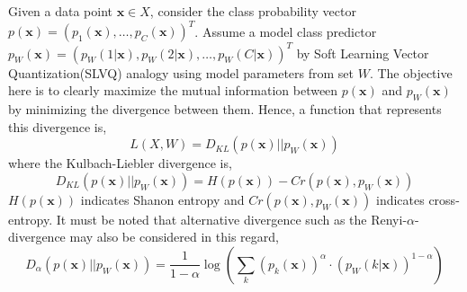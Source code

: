 Given a data point \hspace{2pt}$\mathbf{x}\in X$,\hspace{2pt} consider the class probability vector\hspace{2pt} 
$p\left( \mathbf{x}\right) =\left( p_{1}\left( \mathbf{x}\right)  ,\ldots,p_{C}\left( \mathbf{x}\right)\right)^{T}  $.\hspace{2pt} Assume a model class predictor\hspace{2pt} $p_{W}\left( \mathbf{x}\right) = \left( p_{W}\left( 1|\mathbf{x}\right) ,p_{W}\left( 2|\mathbf{x}\right) ,\ldots,p_{W}\left( C|\mathbf{x}\right)\right) ^{T} $\hspace{2pt} by Soft Learning Vector Quantization(SLVQ) analogy using model parameters from set\hspace{2pt} $W$.\hspace{2pt} The objective here is to clearly maximize the mutual information between \hspace{2pt}$p\left( \mathbf{x}\right) $\hspace{2pt} and \hspace{2pt}$p_{W}\left( \mathbf{x}\right) $\hspace{2pt}by minimizing the divergence between them\cite{villmann2018probabilistic}. Hence, a function that represents this divergence is,
\begin{equation}\label{local errors}
	L\left( X,W\right) = D_{KL}\left( p\left( \mathbf{x}\right) ||p_{W}\left( \mathbf{x}\right) \right) 
\end{equation}
where the Kulbach-Liebler divergence is,
\begin{equation*}%
	D_{KL}\left( p\left( \mathbf{x}\right) ||p_{W}\left( \mathbf{x}\right) \right)= H\left( p\left( \mathbf{x}\right)\right)  - Cr\left( p\left( \mathbf{x}\right) ,p_{W}\left( \mathbf{x}\right) \right) 
\end{equation*}
$H\left( p\left( \mathbf{x}\right)\right) $ \hspace{2pt}indicates Shanon entropy and\hspace{2pt} $Cr\left( p\left( \mathbf{x}\right) ,p_{W}\left( \mathbf{x}\right) \right)$\hspace{2pt} indicates cross-entropy.
It must be noted that alternative divergence such as the Renyi-$\alpha$-divergence may also be considered in this regard,
\begin{equation}\label{Renyi-divergence}
	D_{\alpha}\left( p\left( \mathbf{x}\right) ||p_{W}\left( \mathbf{x}\right) \right) =\frac{1}{1-\alpha}\log\left( \sum_{k}\left( p_{k}\left( \mathbf{x}\right) \right) ^{\alpha}\cdot\left( p_{W}\left( k|\mathbf{x}\right) \right) ^{1-\alpha}\right) 	
\end{equation}
